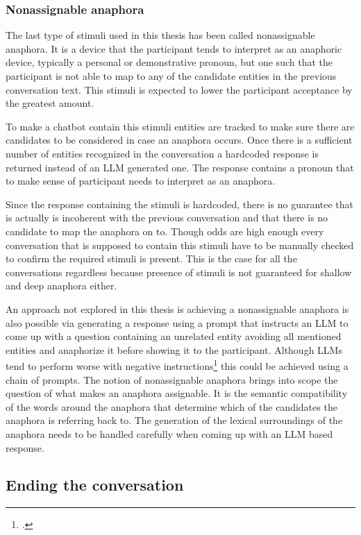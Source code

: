 \documentclass[12pt]{report}
\begin{document}
{\subsubsection{Nonassignable anaphora}

The last type of stimuli used in this thesis
has been called nonassignable anaphora.
It is a device that the participant tends to
interpret as an anaphoric device,
typically a personal or demonstrative pronoun,
but one such that the participant is not able
to map to any of the candidate entities
in the previous conversation text.
This stimuli is expected to lower the participant acceptance
by the greatest amount.

To make a chatbot contain this stimuli
entities are tracked to make sure
there are candidates to be considered
in case an anaphora occurs.
Once there is a sufficient number of
entities recognized in the conversation
a hardcoded response is returned instead of an LLM generated one.
The response contains a pronoun that to make sense of
participant needs to interpret as an anaphora.

Since the response containing the stimuli is hardcoded,
there is no guarantee
that is actually is incoherent with the previous conversation
and that there is no candidate to map the anaphora on to.
Though odds are high enough
every conversation that is supposed to contain this stimuli
have to be manually checked
to confirm the required stimuli is present.
This is the case for all the conversations regardless
because presence of stimuli is not guaranteed
for shallow and deep anaphora either.

An approach not explored in this thesis is
achieving a nonassignable anaphora is also possible
via generating a response
using a prompt that instructs an LLM
to come up with a question containing an unrelated entity
avoiding all mentioned entities
and anaphorize it before showing it to the participant.
Although LLMs tend to perform worse with negative instructions\footcite{negated_prompts}
this could be achieved using a chain of prompts.
The notion of nonassignable anaphora
brings into scope the question of
what makes an anaphora assignable.
It is the semantic compatibility of the words around the anaphora
that determine which of the candidates the anaphora is referring back to.
The generation of the lexical surroundings of the anaphora
needs to be handled carefully
when coming up with an LLM based response.

\subsection{Ending the conversation}

}
\end{document}
